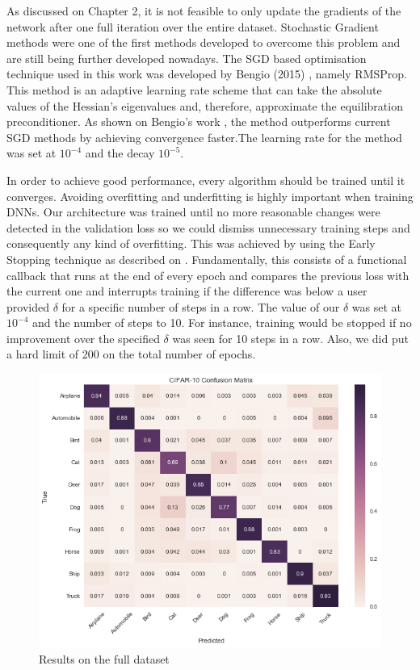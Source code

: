 As discussed on Chapter 2, it is not feasible to only update the gradients of the network after one full iteration over the entire dataset. Stochastic Gradient methods were one of the first methods developed to overcome this problem and are still being further developed nowadays. The SGD based optimisation technique used in this work was developed by Bengio (2015) \cite{bengiormsprop}, namely RMSProp. This method is an adaptive learning rate scheme that can take the absolute values of the Hessian's eigenvalues and, therefore, approximate the equilibration preconditioner. As shown on Bengio's work \cite{bengiormsprop}, the method outperforms current SGD methods by achieving convergence faster.The learning rate for the method was set at $10^{-4}$ and the decay $10^{-5}$.

In order to achieve good performance, every algorithm should be trained until it converges. Avoiding overfitting and underfitting is highly important when training DNNs. Our architecture was trained until no more reasonable changes were detected in the validation loss so we could dismiss unnecessary training steps and consequently any kind of overfitting. This was achieved by using the Early Stopping technique as described on \cite{stanford2016}. Fundamentally, this consists of a functional callback that runs at the end of every epoch and compares the previous loss with the current one and interrupts training if the difference was below a user provided $\delta$ for a specific number of steps in a row. The value of our $\delta$ was set at $10^{-4}$ and the number of steps to 10. For instance, training would be stopped if no improvement over the specified $\delta$ was seen for 10 steps in a row. Also, we did put a hard limit of 200 on the total number of epochs.

\begin{figure}[!h]
	\centering
	\includegraphics[scale=0.6]{conf_matrix.png}
	\caption{Results on the full dataset}
	\label{fig:conf_matrix}
\end{figure}

